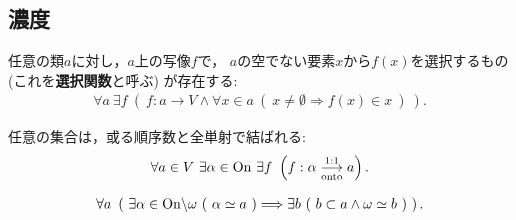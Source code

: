 \subsection{濃度}
	\begin{screen}
		\begin{axm}[選択公理]
			任意の類$a$に対し，$a$上の写像$f$で，
			$a$の空でない要素$x$から$f(x)$を選択するもの
			(これを{\bf 選択関数}と呼ぶ)
			が存在する:
			\begin{align}
				\forall a\ \exists f\ \left(\ 
				f:a \longrightarrow V \wedge \forall x \in a\ 
				(\ x \neq \emptyset \Longrightarrow f(x) \in x\ )\ \right). 
			\end{align}
		\end{axm}
	\end{screen}
	
	\begin{screen}
		\begin{thm}[整列可能定理]
			任意の集合は，或る順序数と全単射で結ばれる:
			\begin{align}
				\forall a \in V\ \exists \alpha \in \ON\ 
				\exists f\ \left( f:\alpha \bij a \right).
			\end{align}
		\end{thm}
	\end{screen}
	
	\begin{screen}
		\begin{dfn}[有限・可算・無限]
			
		\end{dfn}
	\end{screen}
	
	\begin{screen}
		\begin{thm}[任意の無限集合は可算集合を含む]
			\begin{align}
				\forall a\ \left(\ \exists \alpha \in \mathrm{On} \backslash {\bf \omega}\ (\  \alpha \simeq a\ )
				\Longrightarrow \exists b\ (\ b \subset a \wedge {\bf \omega} \simeq b\ )\ \right).
			\end{align}
		\end{thm}
	\end{screen}
